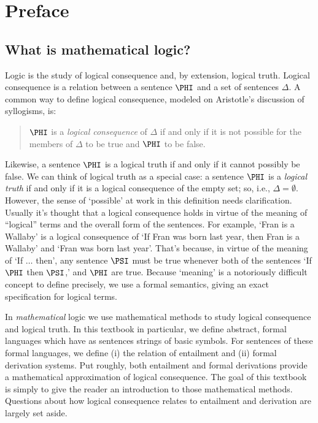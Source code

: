 \documentclass[11pt,fleqn,twoside,openright]{report}%
\newcommand{\df}[1]{\textit{#1}\index{#1|textbf}}
\newcommand{\mention}[1]{`#1'}
\newcommand{\niidf}[1]{\textit{#1}}
\newcommand{\sq}[1]{{``}#1{''}}
\let\origdoublepage\cleardoublepage
\newcommand{\clearemptydoublepage}{%
  \clearpage
  {\pagestyle{empty}\origdoublepage}%
}
\let\cleardoublepage\clearemptydoublepage
\begin{document}
\newpage%
\clearemptydoublepage
\pagestyle{plain}
\tableofcontents

\newpage%
\clearemptydoublepage
\pagestyle{plain}

\chapter*{Preface}

\section*{What is mathematical logic?}

Logic is the study of logical consequence and, by extension, logical truth.
Logical consequence is a relation between a sentence $\PHI$ and a set of sentences $\Delta$. 
A common way to define logical consequence, modeled on Aristotle's discussion of syllogisms, is:
\begin{quote}
$\PHI$ is a \df{logical consequence} of $\Delta$ if and only if it is not possible for the members of $\Delta$ to be true and $\PHI$ to be false.
\end{quote}
Likewise, a sentence $\PHI$ is a logical truth if and only if it cannot possibly be false.
We can think of logical truth as a special case: a sentence $\PHI$ is a \niidf{logical truth} if and only if it is a logical consequence of the empty set; so, i.e., $\Delta=\emptyset$.
However, the sense of \mention{possible} at work in this definition needs clarification.  Usually it's thought that a logical consequence holds in virtue of the meaning of \sq{logical} terms and the overall form of the sentences. 
For example, \mention{Fran is a Wallaby} is a logical consequence of \mention{If Fran was born last year, then Fran is a Wallaby} and \mention{Fran was born last year}.  That's because, in virtue of the meaning of \mention{If $\ldots$ then}, any sentence $\PSI$ must be true whenever both of the sentences \mention{If $\PHI$ then $\PSI$,} and $\PHI$ are true.  Because \mention{meaning} is a notoriously difficult concept to define precisely, we use a formal semantics, giving an exact specification for logical terms. 

In \emph{mathematical} logic we use mathematical methods to study logical consequence and logical truth. 
In this textbook in particular, we define abstract, formal languages which have as sentences strings of basic symbols.
For sentences of these formal languages, we define (i) the relation of entailment and (ii) formal derivation systems. 
Put roughly, both entailment and formal derivations provide a mathematical approximation of logical consequence.
The goal of this textbook is simply to give the reader an introduction to those mathematical methods.  
Questions about how logical consequence relates to entailment and derivation are largely set aside. 
\end{document}
